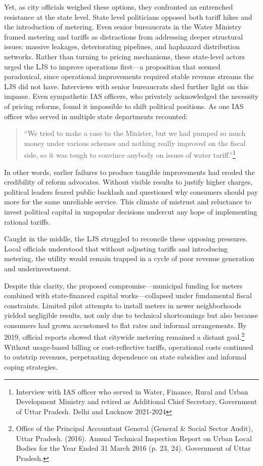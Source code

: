Yet, as city officials weighed these options, they confronted an entrenched resistance at the state level. State level politicians opposed both tariff hikes and the introduction of metering. Even senior bureaucrats in the Water Ministry framed metering and tariffs as distractions from addressing deeper structural issues: massive leakages, deteriorating pipelines, and haphazard distribution networks. Rather than turning to pricing mechanisms, these state-level actors urged the LJS to improve operations first—a proposition that seemed paradoxical, since operational improvements required stable revenue streams the LJS did not have. Interviews with senior bureaucrats shed further light on this impasse. Even sympathetic IAS officers, who privately acknowledged the necessity of pricing reforms, found it impossible to shift political positions. As one IAS officer who served in multiple state departments recounted:

 \begin{quote}

 “We tried to make a case to the Minister, but we had pumped so much money under various schemes and nothing really improved on the fiscal side, so it was tough to convince anybody on issues of water tariff.”\footnote{Interview with IAS officer who served in Water, Finance, Rural and Urban Development Ministry and retired as Additional Chief Secretary, Government of Uttar Pradesh. Delhi and Lucknow 2021-2024} \end{quote}

In other words, earlier failures to produce tangible improvements had eroded the credibility of reform advocates. Without visible results to justify higher charges, political leaders feared public backlash and questioned why consumers should pay more for the same unreliable service. This climate of mistrust and reluctance to invest political capital in unpopular decisions undercut any hope of implementing rational tariffs.

Caught in the middle, the LJS struggled to reconcile these opposing pressures. Local officials understood that without adjusting tariffs and introducing metering, the utility would remain trapped in a cycle of poor revenue generation and underinvestment.

Despite this clarity, the proposed compromise—municipal funding for meters combined with state-financed capital works—collapsed under fundamental fiscal constraints. Limited pilot attempts to install meters in newer neighborhoods yielded negligible results, not only due to technical shortcomings but also because consumers had grown accustomed to flat rates and informal arrangements. By 2019, official reports showed that citywide metering remained a distant goal.\footnote{Office of the Principal Accountant General (General \& Social Sector Audit), Uttar Pradesh. (2016). Annual Technical Inspection Report on Urban Local Bodies for the Year Ended 31 March 2016 (p. 23, 24). Government of Uttar Pradesh.} Without usage-based billing or cost-reflective tariffs, operational costs continued to outstrip revenues, perpetuating dependence on state subsidies and informal coping strategies.


